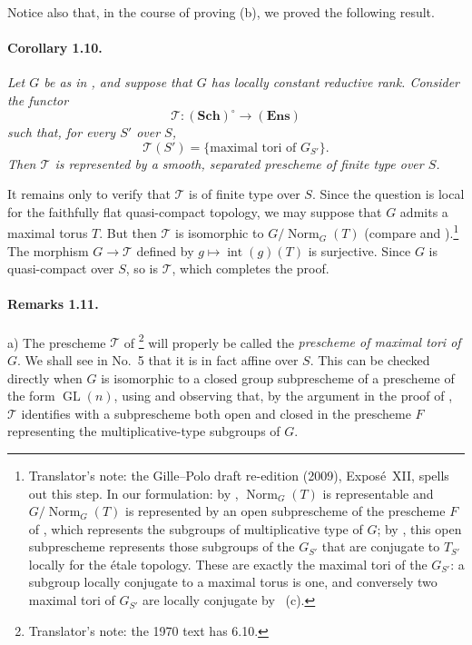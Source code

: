 Notice also that, in the course of proving (b), we proved the
following result.

\paragraph{\textbf{Corollary 1.10.}}
\emph{Let \(G\) be as in , and suppose that \(G\) has locally
constant reductive rank. Consider the functor
\[
  \mathcal T:(\mathbf{Sch})^\circ\longrightarrow(\mathbf{Ens})
\]
such that, for every \(S'\) over \(S\),
\[
  \mathcal T(S')=
  \{\text{maximal tori of }G_{S'}\}.
\]
Then \(\mathcal T\) is represented by a smooth, separated prescheme of
finite type over \(S\).}

It remains only to verify that \(\mathcal T\) is of finite type over
\(S\). Since the question is local for the faithfully flat
quasi-compact topology, we may suppose that \(G\) admits a maximal
torus \(T\). But then \(\mathcal T\) is isomorphic to
\(G/\operatorname{Norm}_G(T)\) (compare  and ).\footnote{Translator's
note: the Gille--Polo draft re-edition (2009), Exposé~XII, spells out this step. In our
formulation: by , \(\operatorname{Norm}_G(T)\) is representable and
\(G/\operatorname{Norm}_G(T)\) is represented by an open subprescheme of the prescheme \(F\) of
, which represents the subgroups of multiplicative type of \(G\); by
, this open subprescheme represents those subgroups of the \(G_{S'}\) that
are conjugate to \(T_{S'}\) locally for the étale topology. These are exactly the maximal tori of
the \(G_{S'}\): a subgroup locally conjugate to a maximal torus is one, and conversely two maximal
tori of \(G_{S'}\) are locally conjugate by ~(c).}
The morphism \(G\to\mathcal T\) defined by
\(g\mapsto\operatorname{int}(g)(T)\) is surjective. Since \(G\) is
quasi-compact over \(S\), so is \(\mathcal T\), which completes the
proof.

\paragraph{\textbf{Remarks 1.11.}}
a) The prescheme \(\mathcal T\) of \footnote{Translator's note: the 1970 text has 6.10.} will properly be called the
\emph{prescheme of maximal tori of \(G\)}. We shall see in No.~5 that
it is in fact affine over \(S\). This can be checked directly when
\(G\) is isomorphic to a closed group subprescheme of a prescheme of
the form \(\operatorname{GL}(n)\), using  and observing that, by
the argument in the proof of , \(\mathcal T\) identifies with a
subprescheme both open and closed in the prescheme \(F\) representing
the multiplicative-type subgroups of \(G\).

